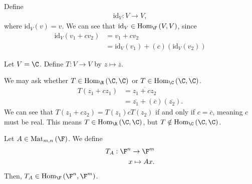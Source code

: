 \documentclass[12pt]{mypackage}
\begin{document}
\begin{example}
  Define
  \begin{align*}
    \text{id}_{V}: V\rightarrow V,
  \end{align*}
  where $\text{id}_V(v) = v$. We can see that $\text{id}_V \in \text{Hom}_{\F}\left(V,V\right)$, since
  \begin{align*}
    \text{id}_V\left(v_1 + cv_2\right) &= v_1 + cv_2\\
                            &= \text{id}_V\left(v_1\right) + (c)\left(\text{id}_{V}\left(v_2\right)\right)
  \end{align*}
\end{example}
\begin{example}
  Let $V = \C$. Define $T: V\rightarrow V$ by $z\mapsto \overline{z}$.\newline

  We may ask whether $T\in \text{Hom}_{\R}\left(\C,\C\right)$ or $T\in \text{Hom}_{\C}\left(\C,\C\right)$.
  \begin{align*}
    T\left(z_1 + cz_1\right) &= \overline{z_1 + cz_2}\\
                             &= \overline{z_1} + \left(\overline{c} \right)\left(\overline{z_2}\right).
  \end{align*}
  We can see that $T\left(z_1 + cz_2\right) = T\left(z_1\right) cT\left(z_2\right)$ if and only if $c = \overline{c}$, meaning $c$ must be real. This means $T\in \text{Hom}_{\R}\left(\C,\C\right)$, but $T\notin \text{Hom}_{\C}\left(\C,\C\right)$.
\end{example}
\begin{example}[Matrices]
  Let $A \in \text{Mat}_{m,n}\left(\F\right)$. We define
  \begin{align*}
    T_{A}: \F^n \rightarrow \F^m\\
    x \mapsto Ax.
  \end{align*}
  Then, $T_A \in \text{Hom}_{\F}\left(\F^n,\F^m\right)$.
\end{example}
\end{document}
